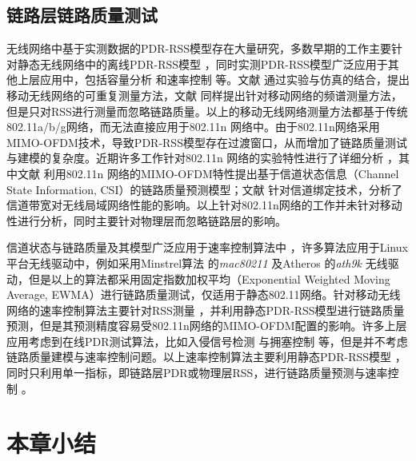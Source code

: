 \subsection{链路层链路质量测试}
\label{sec:mac}

无线网络中基于实测数据的PDR-RSS模型存在大量研究，多数早期的工作主要针对静态无线网络中的离线PDR-RSS模型 \cite{kolar2011mesh} \cite{reis2006model}，同时实测PDR-RSS模型广泛应用于其他上层应用中，包括容量分析 \cite{kashyap2007capacity} 和速率控制 \cite{chen2011ram} \cite{judd2008efficient} 等。文献 \cite{10.1109/TMC.2009.87} 通过实验与仿真的结合，提出移动无线网络的可重复测量方法，文献 \cite{kim2010sybot} 同样提出针对移动网络的频谱测量方法，但是只对RSS进行测量而忽略链路质量。以上的移动无线网络测量方法都基于传统802.11a/b/g网络，而无法直接应用于802.11n 网络中。由于802.11n网络采用MIMO-OFDM技术，导致PDR-RSS模型存在过渡窗口，从而增加了链路质量测试与建模的复杂度。近期许多工作针对802.11n 网络的实验特性进行了详细分析 \cite{Halperin2010predictable} \cite{k.rayanchu:fluid:}，其中文献 \cite{Halperin2010predictable} 利用802.11n 网络的MIMO-OFDM特性提出基于信道状态信息（Channel State Information, CSI）的链路质量预测模型；文献 \cite{k.rayanchu:fluid:} 针对信道绑定技术，分析了信道带宽对无线局域网络性能的影响。以上针对802.11n网络的工作并未针对移动性进行分析，同时主要针对物理层而忽略链路层的影响。

信道状态与链路质量及其模型广泛应用于速率控制算法中 \cite{kim2009experimental} \cite{Pefkianakis:2010} \cite{zhang2008practical} \cite{Li:2012:ERA:2348543.2348585}，许多算法应用于Linux平台无线驱动中，例如采用Minstrel算法 \cite{minstrel} 的\textit{mac80211} 及Atheros \cite{wong2008wireless}的\textit{ath9k} 无线驱动，但是以上的算法都采用固定指数加权平均（Exponential Weighted Moving Average, EWMA）进行链路质量测试，仅适用于静态802.11网络。针对移动无线网络的速率控制算法主要针对RSS测量 \cite{chen2011ram} \cite{judd2008efficient}，并利用静态PDR-RSS模型进行链路质量预测，但是其预测精度容易受802.11n网络的MIMO-OFDM配置的影响。许多上层应用考虑到在线PDR测试算法，比如入侵信号检测 \cite{5620919} 与拥塞控制 \cite{floyd2000equation} 等，但是并不考虑链路质量建模与速率控制问题。以上速率控制算法主要利用静态PDR-RSS模型 \cite{kashyap2007capacity} \cite{kolar2011mesh} \cite{reis2006model}，同时只利用单一指标，即链路层PDR或物理层RSS，进行链路质量预测与速率控制 \cite{judd2008efficient} \cite{zhang2008practical}。

\section{本章小结}

